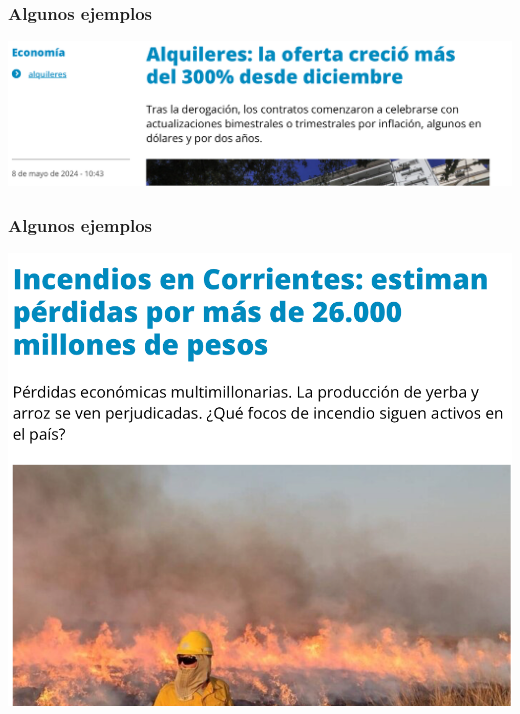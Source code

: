 \documentclass{beamer}
\begin{document}
\begin{frame}
\frametitle{Algunos ejemplos}
    \begin{center}
    \includegraphics[scale=0.5]{../Figures/M6.3.png}
    \end{center}
\end{frame}

\begin{frame}
\frametitle{Algunos ejemplos}
    \begin{center}
    \includegraphics[scale=0.45]{../Figures/M6.4.png}
    \end{center}
\end{frame}
\end{document}
